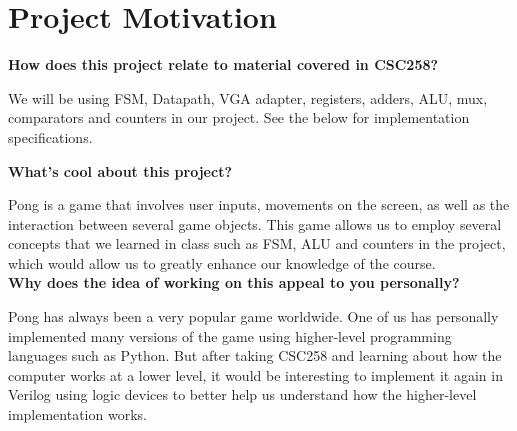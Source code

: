 \documentclass[12pt]{article}
\begin{document}
\onehalfspacing
\section*{Project Motivation}

\textbf{How does this project relate to material covered in CSC258?}

We will be using FSM, Datapath, VGA adapter, registers, adders, ALU, mux, comparators and counters in our project. See the below for implementation specifications.

\singlespacing

\noindent{}

\onehalfspacing
\hspace{0pt}

\textbf{What’s cool about this project?}

Pong is a game that involves user inputs, movements on the screen, as well as the interaction between several game objects. This game allows us to employ several concepts that we learned in class such as FSM, ALU and counters in the project, which would allow us to greatly enhance our knowledge of the course. \\


\textbf{Why does the idea of working on this appeal to you personally?}

Pong has always been a very popular game worldwide. One of us has personally implemented many versions of the game using higher-level programming languages such as Python. But after taking CSC258 and learning about how the computer works at a lower level, it would be interesting to implement it again in Verilog using logic devices to better help us understand how the higher-level implementation works.
\end{document}
